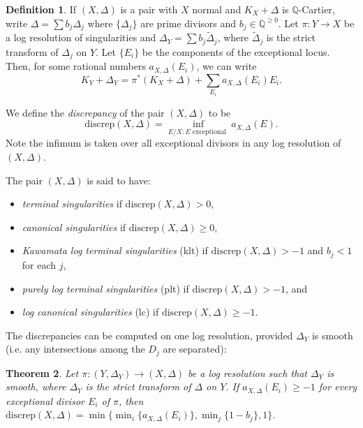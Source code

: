\documentclass[11pt]{amsart}
\numberwithin{equation}{section}
\newtheorem{theorem}{Theorem}[section]
\theoremstyle{definition}
\newtheorem{definition}[theorem]{Definition}
\newcommand{\bQ}{\mathbb{Q}}
\begin{document}
\begin{definition}{\cite[Definition 2.28]{KM98}}
    If $(X,\Delta)$ is a pair with $X$ normal and $K_X +\Delta$ is $\bQ$-Cartier, write $\Delta = \sum b_j \Delta_j$ where $\{ \Delta_j\}$ are prime divisors and $b_j \in \bQ^{\ge 0}$.  Let $\pi: Y \to X$ be a log resolution of singularities and $\Delta_Y = \sum b_j \tilde{\Delta}_j$, where $\tilde{\Delta}_j$ is the strict transform of $\Delta_j$ on $Y$.  Let $\{ E_i \}$ be the components of the exceptional locus.  Then, for some rational numbers $a_{X,\Delta}(E_i)$, we can write
    \[ K_Y + \Delta_Y = \pi^* (K_X+\Delta) + \sum_{E_i} a_{X,\Delta}(E_i) E_i .\]

    We define the \textit{discrepancy} of the pair $(X,\Delta)$ to be \[\mathrm{discrep } (X,\Delta) = \inf_{E/X: E \text{ exceptional }} a_{X,\Delta}(E).\]  Note the infimum is taken over all exceptional divisors in any log resolution of $(X,\Delta)$.

    The pair $(X,\Delta)$ is said to have:
        \begin{itemize}
            \item \textit{terminal singularities} if $\mathrm{discrep } (X,\Delta) > 0 $,
            \item \textit{canonical singularities} if $\mathrm{discrep } (X,\Delta) \ge 0 $,
            \item \textit{Kawamata log terminal singularities} (klt) if $\mathrm{discrep } (X,\Delta) > -1 $ and $b_j < 1$ for each $j$, 
            \item \textit{purely log terminal singularities} (plt) if $\mathrm{discrep } (X,\Delta) > -1 $, and
            \item \textit{log canonical singularities} (lc) if $\mathrm{discrep } (X,\Delta) \ge -1 $.
        \end{itemize}
\end{definition}

The discrepancies can be computed on one log resolution, provided $\Delta_Y$ is smooth (i.e. any intersections among the $D_j$ are separated): 

\begin{theorem}{\cite[Corollary 2.32]{KM98}}\label{t:discrepofpair}
    Let $\pi: (Y,\Delta_Y) \to (X,\Delta)$ be a log resolution such that $\Delta_Y$ is smooth, where $\Delta_Y$ is the strict transform of $\Delta$ on $Y$.  If $a_{X,\Delta}(E_i) \ge -1$ for every exceptional divisor $E_i$ of $\pi$, then $\mathrm{ discrep } (X,\Delta) = \min \{ \min_i \{a_{X, \Delta}(E_i)\} , \min_j \{ 1- b_j \}, 1 \} $.  
\end{theorem}
\end{document}
